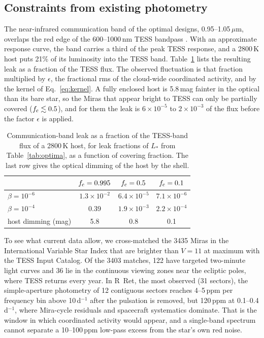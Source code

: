 \documentclass[final,5p]{elsarticle}
\newenvironment{widetable}{\begin{table}[t]}{\end{table}}
\newenvironment{widetable}{\begin{table}[t]}{\end{table}}
\begin{document}
\subsection{Constraints from existing photometry}\label{sec:tess}
The near-infrared communication band of the optimal designs, 0.95--1.05\,$\mu$m, overlaps the red edge of the 600--1000\,nm TESS bandpass \citep{Ricker2015}. With an approximate response curve, the band carries a third of the peak TESS response, and a 2800\,K host puts 21\% of its luminosity into the TESS band. Table~\ref{tab:tess} lists the resulting leak as a fraction of the TESS flux. The observed fluctuation is that fraction multiplied by $\epsilon$, the fractional rms of the cloud-wide coordinated activity, and by the kernel of Eq.~\eqref{eq:kernel}. A fully enclosed host is 5.8\,mag fainter in the optical than its bare star, so the Miras that appear bright to TESS can only be partially covered ($f_{\rm c}\lesssim0.5$), and for them the leak is $6\times10^{-5}$ to $2\times10^{-3}$ of the flux before the factor $\epsilon$ is applied.

\begin{widetable}
\centering
\caption{Communication-band leak as a fraction of the TESS-band flux of a 2800\,K host, for leak fractions of $L_\ast$ from Table~\ref{tab:optima}, as a function of covering fraction. The last row gives the optical dimming of the host by the shell.}
\label{tab:tess}
\small
\begin{tabular}{lccc}
\toprule
 & $f_{\rm c}=0.995$ & $f_{\rm c}=0.5$ & $f_{\rm c}=0.1$ \\
\midrule
$\beta=10^{-6}$ & $1.3\times10^{-2}$ & $6.4\times10^{-5}$ & $7.1\times10^{-6}$ \\
$\beta=10^{-4}$ & 0.39 & $1.9\times10^{-3}$ & $2.2\times10^{-4}$ \\
host dimming (mag) & 5.8 & 0.8 & 0.1 \\
\bottomrule
\end{tabular}
\end{widetable}

To see what current data allow, we cross-matched the 3435 Miras in the International Variable Star Index \citep{Watson2006} that are brighter than $V=11$ at maximum with the TESS Input Catalog. Of the 3403 matches, 122 have targeted two-minute light curves and 36 lie in the continuous viewing zones near the ecliptic poles, where TESS returns every year. In R~Ret, the most observed (31 sectors), the simple-aperture photometry of 12 contiguous sectors reaches 4--5\,ppm per frequency bin above 10\,d$^{-1}$ after the pulsation is removed, but 120\,ppm at 0.1--0.4\,d$^{-1}$, where Mira-cycle residuals and spacecraft systematics dominate. That is the window in which coordinated activity would appear, and a single-band spectrum cannot separate a 10--100\,ppm low-pass excess from the star's own red noise.
\end{document}
